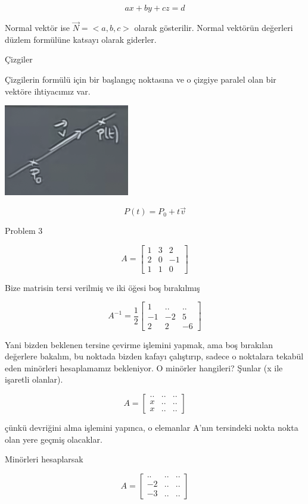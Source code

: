 \documentclass[12pt,fleqn]{article}\usepackage{../../common}
\begin{document}
$$ ax + by + cz  = d $$

Normal vektör ise $\vec{N} = < a,b,c >$ olarak gösterilir. Normal vektörün
değerleri düzlem formülüne katsayı olarak giderler.

Çizgiler

Çizgilerin formülü için bir başlangıç noktasına ve o çizgiye paralel olan bir
vektöre ihtiyacımız var.

\includegraphics[height=4cm]{7_2.png}

$$ P(t) = P_0 + t \vec{v} $$

Problem 3

$$ A = 
\left[\begin{array}{rrr}
1 & 3 & 2 \\
2 & 0 & -1 \\
1 & 1 & 0
\end{array}\right]
 $$

Bize matrisin tersi verilmiş ve iki öğesi boş bırakılmış

$$ A^{-1} = \frac{1}{2}
\left[\begin{array}{rrr}
1 & .. & .. \\
-1 & -2 & 5 \\
2 & 2 & -6
\end{array}\right]
 $$

Yani bizden beklenen tersine çevirme işlemini yapmak, ama boş bırakılan
değerlere bakalım, bu noktada bizden kafayı çalıştırıp, sadece o noktalara
tekabül eden minörleri hesaplamamız bekleniyor. O minörler hangileri? Şunlar (x
ile işaretli olanlar).

$$ A = 
\left[\begin{array}{rrr}
.. & .. & ..\\
x & .. & ..\\
x & .. & ..
\end{array}\right]
 $$

çünkü devriğini alma işlemini yapınca, o elemanlar A'nın tersindeki nokta nokta
olan yere geçmiş olacaklar.

Minörleri hesaplarsak

$$ A = 
\left[\begin{array}{rrr}
.. & .. & ..\\
-2 & .. & ..\\
-3 & .. & ..
\end{array}\right]
 $$
\end{document}
